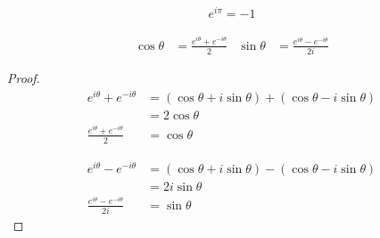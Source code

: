 \begin{proposition}
    \begin{align*}
        e^{i \pi} = -1
    \end{align*}
\end{proposition}

\begin{proposition}
    \begin{align*}
        \cos{\theta} &= \frac{e^{i\theta} + e^{-i\theta}}{2} & \sin{\theta} &= \frac{e^{i\theta} - e^{-i\theta}}{2i}
    \end{align*}
    \begin{proof}
        \begin{align*}
            e^{i\theta} + e^{-i\theta} &= (\cos{\theta} + i\sin{\theta}) + (\cos{\theta} - i\sin{\theta}) \\
                                       &= 2\cos{\theta} \\
        \frac{e^{i\theta} + e^{-i\theta}}{2} &= \cos{\theta}
        \end{align*}
        
        \begin{align*}
            e^{i\theta} - e^{-i\theta} &= (\cos{\theta} + i\sin{\theta}) - (\cos{\theta} - i\sin{\theta}) \\
                                       &= 2i\sin{\theta} \\
            \frac{e^{i\theta} - e^{-i\theta}}{2i} &= \sin{\theta} 
        \end{align*}
    \end{proof}
\end{proposition}
